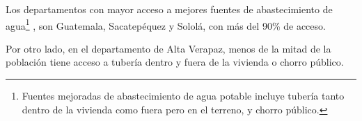  Los departamentos con mayor acceso a mejores fuentes de abastecimiento de agua\footnote{Fuentes mejoradas de abastecimiento de agua potable incluye tubería tanto  dentro de la vivienda como  fuera pero en el terreno, y chorro público.} , son Guatemala, Sacatepéquez y Sololá, con más del 90\% de acceso. 
 
  Por otro lado, en el departamento de Alta Verapaz, menos de la mitad de la población tiene acceso a tubería dentro y fuera de la vivienda o  chorro público.